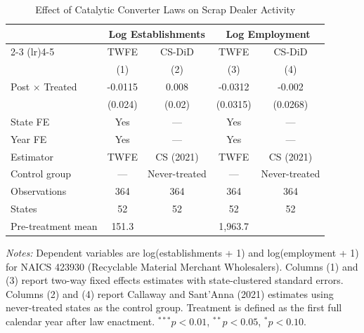 \begin{table}[htbp]
\centering
\caption{Effect of Catalytic Converter Laws on Scrap Dealer Activity}
\label{tab:main}
\begin{threeparttable}
\begin{tabular}{lcccc}
\toprule
 & \multicolumn{2}{c}{Log Establishments} & \multicolumn{2}{c}{Log Employment} \\
\cmidrule(lr){2-3} \cmidrule(lr){4-5}
 & TWFE & CS-DiD & TWFE & CS-DiD \\
 & (1) & (2) & (3) & (4) \\
\midrule
Post $\times$ Treated & -0.0115 & 0.008 & -0.0312 & -0.002 \\
 & (0.024) & (0.02) & (0.0315) & (0.0268) \\
\addlinespace
State FE & Yes & --- & Yes & --- \\
Year FE & Yes & --- & Yes & --- \\
Estimator & TWFE & CS (2021) & TWFE & CS (2021) \\
Control group & --- & Never-treated & --- & Never-treated \\
Observations & 364 & 364 & 364 & 364 \\
States & 52 & 52 & 52 & 52 \\
Pre-treatment mean & 151.3 & &1,963.7 & \\
\bottomrule
\end{tabular}
\begin{tablenotes}[flushleft]
\small
\item \textit{Notes:} Dependent variables are log(establishments + 1) and log(employment + 1) for NAICS 423930 (Recyclable Material Merchant Wholesalers). Columns (1) and (3) report two-way fixed effects estimates with state-clustered standard errors. Columns (2) and (4) report Callaway and Sant'Anna (2021) estimates using never-treated states as the control group. Treatment is defined as the first full calendar year after law enactment. $^{***}p<0.01$, $^{**}p<0.05$, $^{*}p<0.10$.
\end{tablenotes}
\end{threeparttable}
\end{table}

